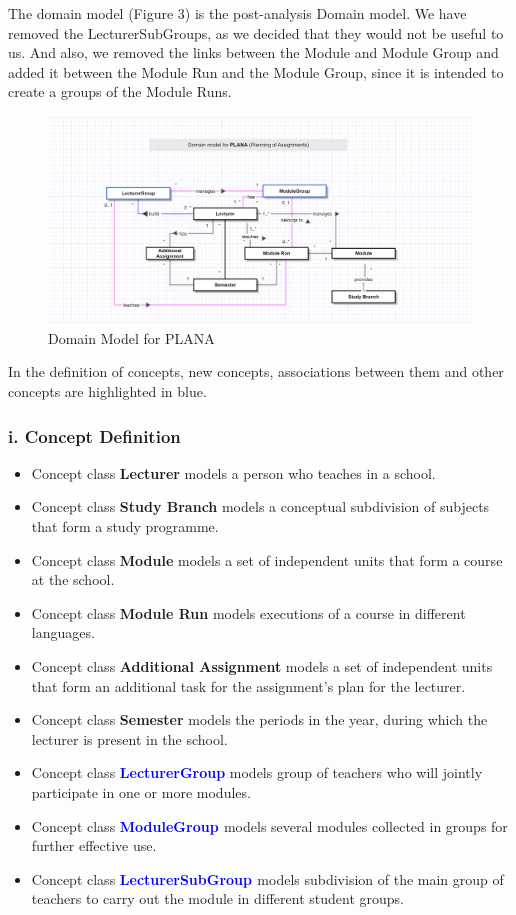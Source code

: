 \documentclass{scrartcl}
\begin{document}
The domain model (Figure 3) is the post-analysis Domain model. We have removed the LecturerSubGroups, as we decided that they would not be useful to us. And also, we removed the links between the Module and Module Group and added it between the Module Run and the Module Group, since it is intended to create a groups of the Module Runs.
\begin{figure}[H]
\centering
\includegraphics[width=150mm]{uml/domain-b3.JPG}
\caption{Domain Model for PLANA}
\label{blabla}
\end{figure}

In the definition of concepts, new concepts, associations between them and other concepts are highlighted in blue.

	    \subsubsection{i. Concept Definition}
	    
	    \begin{itemize}
	    \item Concept class \textbf{Lecturer} models a person who teaches in a school.
	     \item Concept class \textbf{Study Branch} models a conceptual subdivision of subjects that form a study programme.
	      \item Concept class \textbf{Module} models a set of independent units that form a course at the school.
	       \item Concept class \textbf{Module Run } models executions of a course in different languages.
	       	      \item Concept class \textbf{Additional Assignment} models a set of independent units that form an additional task for the assignment's plan for the lecturer.
  \item Concept class \textbf{Semester} models the periods in the year, during which the lecturer is present in the school.
  \item Concept class \textbf{\textcolor{blue}{ LecturerGroup}} models   group of teachers who will jointly participate in one or more modules.
   \item Concept class \textbf{\textcolor{blue}{ModuleGroup }}  models
   several modules collected in groups for further effective use.
     \item Concept class \textbf{\textcolor{blue}{LecturerSubGroup }} models subdivision of the main group of teachers to carry out the module in different student groups.
     
	         
	    \end{itemize}
\end{document}
